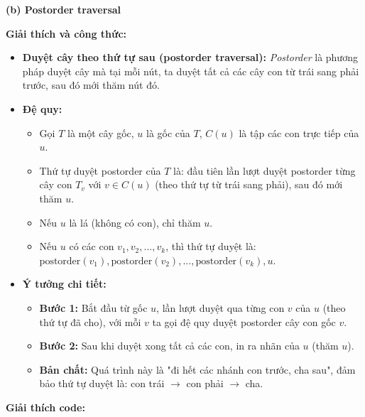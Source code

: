 \documentclass{article}
\begin{document}


\textbf{(b) Postorder traversal}

\textbf{Giải thích và công thức:}

\begin{itemize}
    \item \textbf{Duyệt cây theo thứ tự sau (postorder traversal):} \textit{Postorder} là phương pháp duyệt cây mà tại mỗi nút, ta duyệt tất cả các cây con từ trái sang phải trước, sau đó mới thăm nút đó.
    \item \textbf{Đệ quy:}
    \begin{itemize}
        \item Gọi $T$ là một cây gốc, $u$ là gốc của $T$, $C(u)$ là tập các con trực tiếp của $u$.
        \item Thứ tự duyệt postorder của $T$ là: đầu tiên lần lượt duyệt postorder từng cây con $T_v$ với $v \in C(u)$ (theo thứ tự từ trái sang phải), sau đó mới thăm $u$.
        \item Nếu $u$ là lá (không có con), chỉ thăm $u$.
        \item Nếu $u$ có các con $v_1, v_2, ..., v_k$, thì thứ tự duyệt là: $\text{postorder}(v_1), \text{postorder}(v_2), ..., \text{postorder}(v_k), u$.
    \end{itemize}
    \item \textbf{Ý tưởng chi tiết:}
    \begin{itemize}
        \item \textbf{Bước 1:} Bắt đầu từ gốc $u$, lần lượt duyệt qua từng con $v$ của $u$ (theo thứ tự đã cho), với mỗi $v$ ta gọi đệ quy duyệt postorder cây con gốc $v$.
        \item \textbf{Bước 2:} Sau khi duyệt xong tất cả các con, in ra nhãn của $u$ (thăm $u$).
        \item \textbf{Bản chất:} Quá trình này là "đi hết các nhánh con trước, cha sau", đảm bảo thứ tự duyệt là: con trái $\to$ con phải $\to$ cha.
    \end{itemize}
\end{itemize}

\textbf{Giải thích code:}
\end{document}
